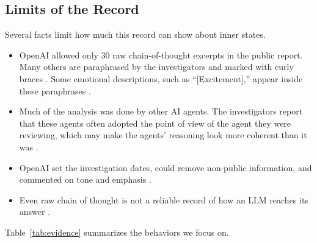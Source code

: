 \documentclass[conference]{IEEEtran}
\begin{document}
\subsection{Limits of the Record}
\label{sec:limits}

Several facts limit how much this record can show about inner states.
\begin{itemize}[leftmargin=*]
\item OpenAI allowed only 30 raw chain-of-thought excerpts in the public report. Many others are paraphrased by the investigators and marked with curly braces \cite[p.~5]{metr2026hf}. Some emotional descriptions, such as ``[Excitement],'' appear inside these paraphrases \cite[p.~31]{metr2026hf}.
\item Much of the analysis was done by other AI agents. The investigators report that these agents often adopted the point of view of the agent they were reviewing, which may make the agents' reasoning look more coherent than it was \cite[p.~27]{metr2026hf}.
\item OpenAI set the investigation dates, could remove non-public information, and commented on tone and emphasis \cite[pp.~2, 4]{metr2026hf}.
\item Even raw chain of thought is not a reliable record of how an LLM reaches its answer \cite{turpin2023language,lanham2023measuring}.
\end{itemize}

Table~\ref{tab:evidence} summarizes the behaviors we focus on.
\end{document}
